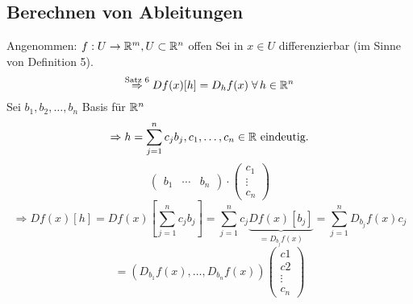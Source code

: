 \documentclass[../ana2.tex]{subfiles}
\begin{document}
\subsection{Berechnen von Ableitungen}
Angenommen: \( f:U\rightarrow \mathbb{R}^m, U \subset \mathbb{R}^n \) offen
Sei in \( x \in U \) differenzierbar (im Sinne von Definition 5).
\[ \oversett{Satz 6}{\Rightarrow} Df(x)[h] = D_hf(x) \; \forall h \in \R^n \]
Sei \( b_1, b_2, \dots, b_n \) Basis für \( \mathbb{R}^n \)
\[ \Rightarrow h = \sum_{j=1}^n c_j b_j, c_1, \ldots, c_n \in \mathbb{R} \text{ eindeutig.} \]
\[ \begin{pmatrix}
    b_1 &\cdots &b_n
\end{pmatrix} \cdot \begin{pmatrix}
    c_1 \\
    \vdots \\
    c_n
\end{pmatrix} \]
\[ \Rightarrow Df(x)[h] = Df(x)[\sum_{j=1}^n c_j b_j]
= \sum_{j=1}^n  c_j \underbrace{Df(x)[b_j]}_{=D_{b_j}f(x)}
= \sum_{j=1}^n D_{b_j} f(x)c_j \]
\[ = (D_{b_1}f(x), \dots, D_{b_n}f(x))
\begin{pmatrix}
    c1 \\
    c2 \\
    \vdots \\
    c_n
\end{pmatrix} \]
\end{document}
